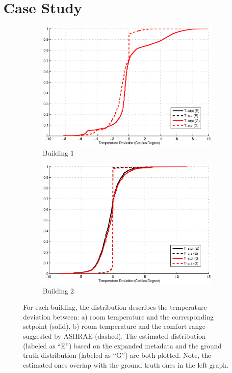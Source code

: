 \section{Case Study}

\begin{figure}[ht!]
\centering
	\begin{subfigure}{0.40\textwidth}
                \centering
		\includegraphics[width=\textwidth]{./figs/soda_cmp.eps}
                \caption{Building 1}
	\end{subfigure}
	\begin{subfigure}{0.40\textwidth}
                \centering
		\includegraphics[width=\textwidth]{./figs/sdh_cmp.eps}
                \caption{Building 2}
	\end{subfigure}
\caption{For each building, the distribution describes the temperature deviation between: a) room temperature and the corresponding setpoint (solid), b) room temperature and the comfort range suggested by ASHRAE (dashed). The estimated distribution (labeled as ``E'') based on the expanded metadata and the ground truth distribution (labeled as ``G'') are both plotted. Note, the estimated ones overlap with the ground truth ones in the left graph.}
\label{fig:cdf_temp}
\end{figure}

